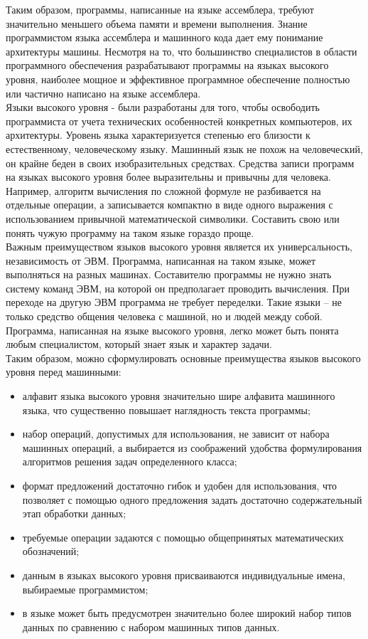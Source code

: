 Таким образом, программы, написанные на языке ассемблера, требуют значительно меньшего объема памяти и времени выполнения. Знание программистом языка ассемблера и машинного кода дает ему понимание архитектуры машины. Несмотря на то, что большинство специалистов в области программного обеспечения разрабатывают программы на языках высокого уровня, наиболее мощное и эффективное программное обеспечение полностью или частично написано на языке ассемблера. \\

Языки высокого уровня - были разработаны для того, чтобы освободить программиста от учета технических особенностей конкретных компьютеров, их архитектуры. Уровень языка характеризуется степенью его близости к естественному, человеческому языку. Машинный язык не похож на человеческий, он крайне беден в своих изобразительных средствах. Средства записи программ на языках высокого уровня более выразительны и привычны для человека. Например, алгоритм вычисления по сложной формуле не разбивается на отдельные операции, а записывается компактно в виде одного выражения с использованием привычной математической символики. Составить свою или понять чужую программу на таком языке гораздо проще. \\

Важным преимуществом языков высокого уровня является их универсальность, независимость от ЭВМ. Программа, написанная на таком языке, может выполняться на разных машинах. Составителю программы не нужно знать систему команд ЭВМ, на которой он предполагает проводить вычисления. При переходе на другую ЭВМ программа не требует переделки. Такие языки – не только средство общения человека с машиной, но и людей между собой. Программа, написанная на языке высокого уровня, легко может быть понята любым специалистом, который знает язык и характер задачи. \\

Таким образом, можно сформулировать основные преимущества языков высокого уровня перед машинными: \\

\begin{itemize}
  \item алфавит языка высокого уровня значительно шире алфавита машинного языка, что существенно повышает наглядность текста программы;
  \item набор операций, допустимых для использования, не зависит от набора машинных операций, а выбирается из соображений удобства формулирования алгоритмов решения задач определенного класса;
  \item формат предложений достаточно гибок и удобен для использования, что позволяет с помощью одного предложения задать достаточно содержательный этап обработки данных;
  \item требуемые операции задаются с помощью общепринятых математических обозначений;
  \item данным в языках высокого уровня присваиваются индивидуальные имена, выбираемые программистом;
  \item в языке может быть предусмотрен значительно более широкий набор типов данных по сравнению с набором машинных типов данных.
\end{itemize}
\

